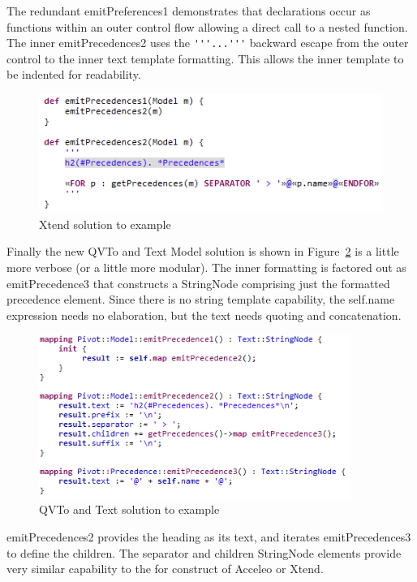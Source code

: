 \documentclass{llncs}
\begin{document}
The redundant emitPreferences1 demonstrates that declarations occur as functions within an outer control flow allowing a direct call to a nested function. The inner emitPrecedences2 uses the \verb|'''...'''| backward escape from the outer control to the inner text template formatting. This allows the inner template to be indented for readability.

\begin{figure}
	\begin{center}
		\includegraphics[width=4.5in]{XtendExample.png}
	\end{center}
	\caption{Xtend solution to example}
	\label{fig:XtendExample}
\end{figure}

Finally the new QVTo and Text Model solution is shown in Figure~\ref{fig:QVToExample} is a little more verbose (or a little more modular). The inner formatting is factored out as emitPrecedence3 that constructs a StringNode comprising just the formatted precedence element. Since there is no string template capability, the self.name expression needs no elaboration, but the text needs quoting and concatenation. 

\begin{figure}
	\begin{center}
		\includegraphics[width=4.0in]{QVToExample.png}
	\end{center}
	\caption{QVTo and Text solution to example}
	\label{fig:QVToExample}
\end{figure}

emitPrecedences2 provides the heading as its text, and iterates emitPrecedences3 to define the children. The separator and children StringNode elements provide very similar capability to the for construct of Acceleo or Xtend. %
\end{document}

